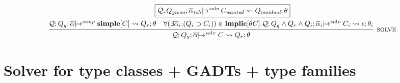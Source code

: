 \documentclass{article}
\newcommand{\multi}[1]{{\overline{#1}}}
\newcommand{\Q}{\mathcal{Q}}
\newcommand{\arrowish}{|\!\!\!\rightarrow}
\newcommand{\rulen}[1]{\textsc{#1}}
\begin{document}
\[
\begin{array}{c}
\framebox{$\Q; Q_\textit{given}; \multi{\alpha}_\textit{tch} \arrowish^\textit{solv} C_\textit{wanted} \rightsquigarrow Q_\textit{residual}; \theta$} \\
\\[-3mm]

\infer[\rulen{solve}]
  {\Q; Q_g; \multi{\alpha} \arrowish^{solv} C \rightsquigarrow Q_r; \theta}
  {\Q; Q_g; \multi{\alpha} \arrowish^{simp} \simple{C} \rightsquigarrow Q_r; \theta &
   \forall (\exists \multi{\alpha}_i. (Q_i \supset C_i)) \in \implic{\theta C}. 
     \Q; Q_g \land Q_r \land Q_i; \multi{\alpha}_i \arrowish^{solv} C_i \rightsquigarrow \epsilon; \theta_i} \\
\end{array}
\]


\section{Solver for type classes + GADTs + type families}

\newcommand{\canon}[2]{\textit{canon}{[}#1{]}(#2)}
\newcommand{\interact}[2]{\textit{interact}{[}#1{]}(#2)}
\newcommand{\topreact}[2]{\textit{topreact}{[}#1{]}(#2)}
\end{document}
